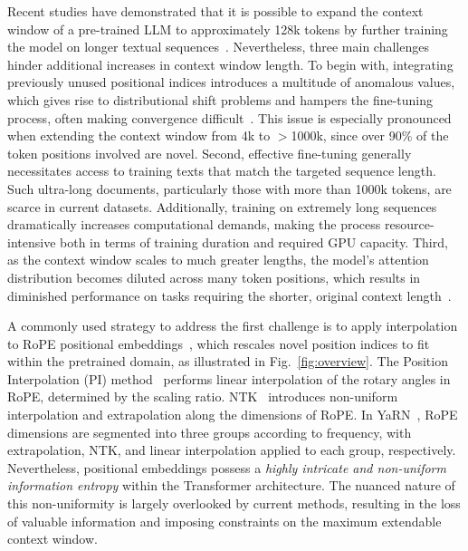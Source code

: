 Recent studies have demonstrated that it is possible to expand the context window of a pre-trained LLM to approximately 128k tokens by further training the model on longer textual sequences~\cite{longlora,pi,yarn,zhang2024soaring,liu2023scaling}. Nevertheless, three main challenges hinder additional increases in context window length. To begin with, integrating previously unused positional indices introduces a multitude of anomalous values, which gives rise to distributional shift problems and hampers the fine-tuning process, often making convergence difficult~\cite{pi}. This issue is especially pronounced when extending the context window from 4k to $>$1000k, since over 90\% of the token positions involved are novel. Second, effective fine-tuning generally necessitates access to training texts that match the targeted sequence length. Such ultra-long documents, particularly those with more than 1000k tokens, are scarce in current datasets. Additionally, training on extremely long sequences dramatically increases computational demands, making the process resource-intensive both in terms of training duration and required GPU capacity. Third, as the context window scales to much greater lengths, the model’s attention distribution becomes diluted across many token positions, which results in diminished performance on tasks requiring the shorter, original context length~\cite{pi}.

A commonly used strategy to address the first challenge is to apply interpolation to RoPE positional embeddings~\cite{rope,pi}, which rescales novel position indices to fit within the pretrained domain, as illustrated in Fig.~\ref{fig:overview}. The Position Interpolation (PI) method~\cite{pi} performs linear interpolation of the rotary angles in RoPE, determined by the scaling ratio. NTK~\cite{ntk,dynamicntk} introduces non-uniform interpolation and extrapolation along the dimensions of RoPE. In YaRN~\cite{yarn}, RoPE dimensions are segmented into three groups according to frequency, with extrapolation, NTK, and linear interpolation applied to each group, respectively. Nevertheless, positional embeddings possess a \emph{highly intricate and non-uniform information entropy} within the Transformer architecture. The nuanced nature of this non-uniformity is largely overlooked by current methods, resulting in the loss of valuable information and imposing constraints on the maximum extendable context window.

